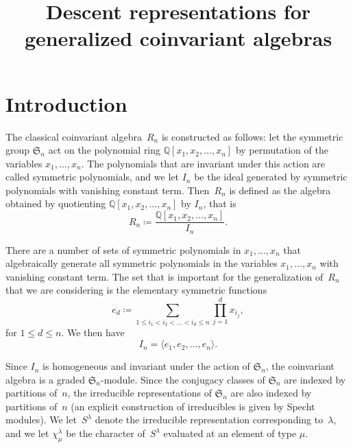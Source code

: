 \documentclass[ALCO,ThmDefs,Unicode,epreuves]{cedram}
\author{\firstname{Kyle} \middlename{P.} \lastname{Meyer}}
\title
[Descent representations]
{Descent representations for generalized coinvariant algebras}
\begin{document}
\maketitle

\section{Introduction}


The classical coinvariant algebra~$R_n$ is constructed as follows: let the symmetric group $\mathfrak{S}_n$ act on the 
polynomial ring $\mathbb{Q}[x_1,x_2,\ldots, x_n]$ by permutation of the variables $x_1,\ldots, x_n$. The polynomials that are 
invariant under this action are called symmetric polynomials, and we let $I_n$ be the ideal generated by symmetric polynomials 
with vanishing constant term. Then~$R_n$ is defined as the algebra obtained by quotienting $\mathbb{Q}[x_1,x_2,\ldots, x_n]$ 
by $I_n$, that is 
\begin{equation}
R_n\coloneqq \frac{\mathbb{Q}[x_1,x_2,\ldots,x_n]}{I_n}.
\end{equation}

There are a number of sets of symmetric polynomials in $x_1,\ldots, x_n$ that algebraically generate all symmetric polynomials 
in the variables $x_1,\ldots, x_n$ with vanishing constant term. The set that is important for the generalization of~$R_n$ 
that we are considering is the elementary symmetric functions 
\begin{equation}
e_d\coloneqq \sum_{1\leq i_1<i_2<\ldots< i_d\leq n} \prod_{j=1}^d x_{i_j},
\end{equation}
 for $1\leq d\leq n$. We then have
\begin{equation}
I_n=\langle e_1,e_2,\ldots, e_n\rangle.
\end{equation}

	Since $I_n$ is homogeneous and invariant under the action of $\mathfrak{S}_n$, the coinvariant algebra is a graded $
\mathfrak{S}_n$-module. Since the conjugacy classes of $\mathfrak{S}_n$ are indexed by partitions of~$n$, the 
irreducible representations of $\mathfrak{S}_n$ are also indexed by partitions of~$n$ (an explicit construction of 
irreducibles is given by Specht modules). We let~$S^\lambda$ denote the irreducible representation corresponding to~$
\lambda$, and we let $\chi^\lambda_\mu$ be the character of~$S^\lambda$ evaluated at an element of type $\mu$.
\end{document}
